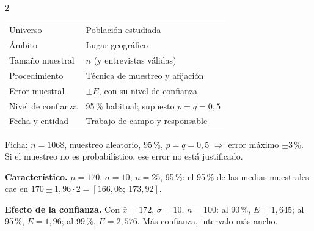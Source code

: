 \documentclass[10pt]{article}
\begin{document}
\begin{multicols}{2}
\begin{tabular}{@{}p{2.6cm}p{5.2cm}@{}}
Universo & Población estudiada\\
Ámbito & Lugar geográfico\\
Tamaño muestral & \(n\) (y entrevistas válidas)\\
Procedimiento & Técnica de muestreo y afijación\\
Error muestral & \(\pm E\), con su nivel de confianza\\
Nivel de confianza & 95\,\% habitual; supuesto \(p=q=0{,}5\)\\
Fecha y entidad & Trabajo de campo y responsable
\end{tabular}

\begin{ejemplo}
Ficha: \(n=1068\), muestreo aleatorio, 95\,\%, \(p=q=0{,}5\) \(\Rightarrow\) error máximo \(\pm3\)\,\%. Si el muestreo no es probabilístico, ese error no está justificado.
\end{ejemplo}

\begin{center}
\end{center}
\begin{ejemplo}
\textbf{Característico.} \(\mu=170\), \(\sigma=10\), \(n=25\), 95\,\%: el 95\,\% de las medias muestrales cae en \(170\pm1{,}96\cdot2=[166{,}08;\ 173{,}92]\).
\end{ejemplo}
\begin{ejemplo}
\textbf{Efecto de la confianza.} Con \(\bar x=172\), \(\sigma=10\), \(n=100\): al 90\,\%, \(E=1{,}645\); al 95\,\%, \(E=1{,}96\); al 99\,\%, \(E=2{,}576\). Más confianza, intervalo más ancho.
\end{ejemplo}


\end{multicols}
\end{document}
